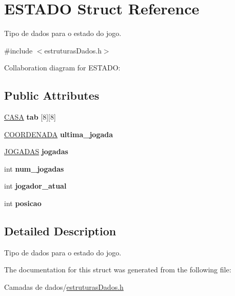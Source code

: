 \hypertarget{structESTADO}{}\section{E\+S\+T\+A\+DO Struct Reference}
\label{structESTADO}


Tipo de dados para o estado do jogo.  




{\ttfamily \#include $<$estruturas\+Dados.\+h$>$}



Collaboration diagram for E\+S\+T\+A\+DO\+:
\subsection*{Public Attributes}
\begin{DoxyCompactItemize}
\item 
\mbox{\label{structESTADO_ab56f0f1be16954d3768b4174d14c087d}} 
\hyperlink{estruturasDados_8h_aba91601f16d4c485b2d9b8c429f27039}{C\+A\+SA} {\bfseries tab} \mbox{[}8\mbox{]}\mbox{[}8\mbox{]}
\item 
\mbox{\label{structESTADO_a4896a5c5c1f40b43fb795623327e3f47}} 
\hyperlink{structCOORDENADA}{C\+O\+O\+R\+D\+E\+N\+A\+DA} {\bfseries ultima\+\_\+jogada}
\item 
\mbox{\label{structESTADO_afae43b87a488fad0f2b56a18bad31d18}} 
\hyperlink{estruturasDados_8h_a94c221d29a1760f008b7834093259b7d}{J\+O\+G\+A\+D\+AS} {\bfseries jogadas}
\item 
\mbox{\label{structESTADO_a261495728744647e618b4e623f5a4b7a}} 
int {\bfseries num\+\_\+jogadas}
\item 
\mbox{\label{structESTADO_a5dd28e2e68b7aef2b6b7ea88e02eff58}} 
int {\bfseries jogador\+\_\+atual}
\item 
\mbox{\label{structESTADO_a729224766aeecbbd38fd93dbec795644}} 
int {\bfseries posicao}
\end{DoxyCompactItemize}


\subsection{Detailed Description}
Tipo de dados para o estado do jogo. 

The documentation for this struct was generated from the following file\+:\begin{DoxyCompactItemize}
\item 
Camadas de dados/\hyperlink{estruturasDados_8h}{estruturas\+Dados.\+h}\end{DoxyCompactItemize}
